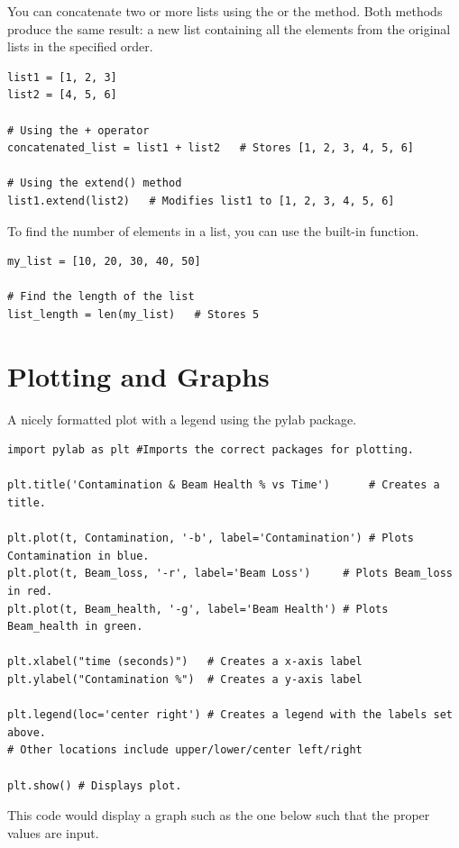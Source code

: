 You can concatenate two or more lists using the  or the  method. Both methods produce the same result: a new list containing all the elements from the original lists in the specified order.
\begin{lstlisting}
list1 = [1, 2, 3]
list2 = [4, 5, 6]

# Using the + operator
concatenated_list = list1 + list2   # Stores [1, 2, 3, 4, 5, 6]

# Using the extend() method
list1.extend(list2)   # Modifies list1 to [1, 2, 3, 4, 5, 6]
\end{lstlisting}

To find the number of elements in a list, you can use the built-in  function.
\begin{lstlisting}
my_list = [10, 20, 30, 40, 50]

# Find the length of the list
list_length = len(my_list)   # Stores 5
\end{lstlisting}








\section{Plotting and Graphs}

A nicely formatted plot with a legend using the pylab package.
\begin{lstlisting}
import pylab as plt #Imports the correct packages for plotting.

plt.title('Contamination & Beam Health % vs Time')      # Creates a title.

plt.plot(t, Contamination, '-b', label='Contamination') # Plots Contamination in blue.
plt.plot(t, Beam_loss, '-r', label='Beam Loss')     # Plots Beam_loss in red.
plt.plot(t, Beam_health, '-g', label='Beam Health') # Plots Beam_health in green.

plt.xlabel("time (seconds)")   # Creates a x-axis label
plt.ylabel("Contamination %")  # Creates a y-axis label

plt.legend(loc='center right') # Creates a legend with the labels set above.
# Other locations include upper/lower/center left/right

plt.show() # Displays plot.
\end{lstlisting}
This code would display a graph such as the one below such that the proper values are input.

